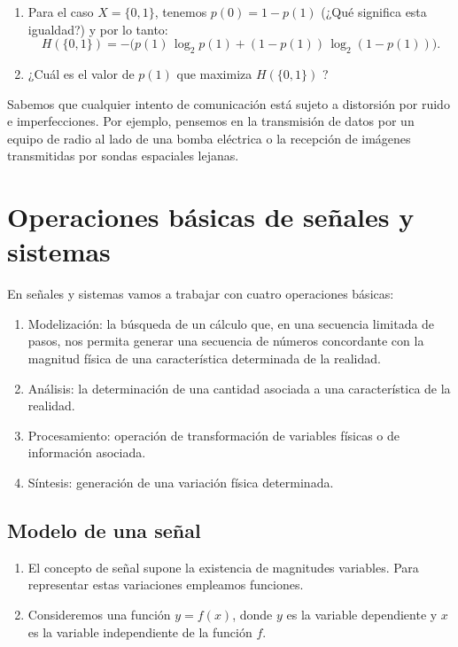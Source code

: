 \documentclass[11pt,a4paper,openany]{book}
\begin{document}
\begin{enumerate}
	\item Para el caso $X = \{0, 1\}$, tenemos $p(0) = 1 - p(1)$ (¿Qué significa esta igualdad?) y por lo tanto:
	\begin{equation}
		H(\{0,1\}) = - \Big( p(1) \, \log_{2} p(1) + (1 - p(1)) \, \log_{2} (1 - p(1)) \Big).
	\end{equation}
	
	\item ¿Cuál es el valor de $p(1)$ que maximiza $H(\{0,1\})$ ?
\end{enumerate}

Sabemos que cualquier intento de comunicación está sujeto a distorsión por ruido e imperfecciones. Por ejemplo, pensemos en la transmisión de datos por un equipo de radio al lado de una bomba eléctrica o la recepción de imágenes transmitidas por sondas espaciales lejanas.

\section{Operaciones básicas de señales y sistemas}

En señales y sistemas vamos a trabajar con cuatro operaciones básicas:
\begin{enumerate}
	\item Modelización: la búsqueda de un cálculo que, en una secuencia limitada de pasos, nos permita generar una secuencia de números concordante con la magnitud física de una característica determinada de la realidad.
	\item Análisis: la determinación de una cantidad asociada a una característica de la realidad.
	\item Procesamiento: operación de transformación de variables físicas o de información asociada.
	\item Síntesis: generación de una variación física determinada.
\end{enumerate}
	
\subsection{Modelo de una señal}

\begin{enumerate}
	\item El concepto de señal supone la existencia de magnitudes variables. Para representar estas variaciones empleamos funciones.
	\item Consideremos una función $y = f(x)$, donde $y$ es la variable dependiente y $x$ es la variable independiente de la función $f$.
\end{enumerate}
\end{document}
